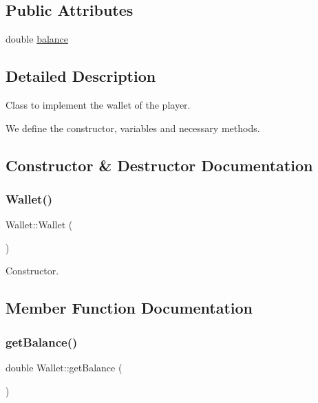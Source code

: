 \subsection*{Public Attributes}
\begin{DoxyCompactItemize}
\item 
double \hyperlink{classWallet_acb690105f6e130dac3c0dbd90e842d0a}{balance}
\end{DoxyCompactItemize}


\subsection{Detailed Description}
Class to implement the wallet of the player. 

We define the constructor, variables and necessary methods. 

\subsection{Constructor \& Destructor Documentation}
\mbox{\label{classWallet_ad9be9e49244b78db9099fcaeccd1af04}} 
\subsubsection{\texorpdfstring{Wallet()}{Wallet()}}
{\footnotesize\ttfamily Wallet\+::\+Wallet (\begin{DoxyParamCaption}{ }\end{DoxyParamCaption})}

Constructor. 

\subsection{Member Function Documentation}
\mbox{\label{classWallet_a87b3f7dec77a607a67df9c5d5503b3c6}} 
\subsubsection{\texorpdfstring{get\+Balance()}{getBalance()}}
{\footnotesize\ttfamily double Wallet\+::get\+Balance (\begin{DoxyParamCaption}{ }\end{DoxyParamCaption})}

